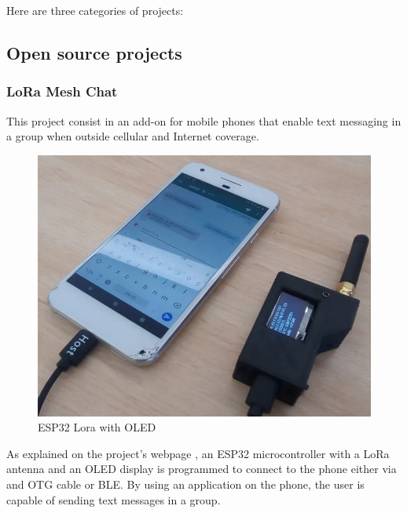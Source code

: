 		Here are three categories of projects:
		
		\subsection{Open source projects}
		
			\subsubsection{LoRa Mesh Chat}\label{subsubsec:lorameshchat}

				This project consist in an add-on for mobile phones that enable text messaging in a group when outside cellular and Internet coverage.		
					
				\noindent
				\begin{minipage}{0.5\textwidth}%
					\begin{figure}[H]
						\centering
						\includegraphics[width=.8\textwidth]{resources/img/chap4/lora-mesh-chat-5267d9}
						\caption{ESP32 Lora with OLED}
						\label{img:lora_mesh_chat}
					\end{figure}
				\end{minipage}%
				\hfill%
				\begin{minipage}{0.5\textwidth}\raggedright			
					As explained on the project's webpage \footnotemark, an ESP32 microcontroller with a LoRa antenna and an OLED display is programmed to connect to the phone either via and OTG cable or BLE.
					By using an application on the phone, the user is capable of sending text messages in a group.
				\end{minipage}			
				
